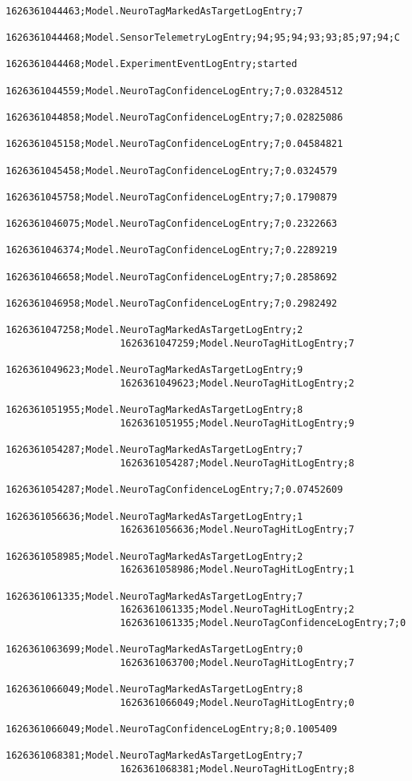                 \begin{lstlisting}
                    1626361044463;Model.NeuroTagMarkedAsTargetLogEntry;7
                    1626361044468;Model.SensorTelemetryLogEntry;94;95;94;93;93;85;97;94;C
                    1626361044468;Model.ExperimentEventLogEntry;started
                    1626361044559;Model.NeuroTagConfidenceLogEntry;7;0.03284512
                    1626361044858;Model.NeuroTagConfidenceLogEntry;7;0.02825086
                    1626361045158;Model.NeuroTagConfidenceLogEntry;7;0.04584821
                    1626361045458;Model.NeuroTagConfidenceLogEntry;7;0.0324579
                    1626361045758;Model.NeuroTagConfidenceLogEntry;7;0.1790879
                    1626361046075;Model.NeuroTagConfidenceLogEntry;7;0.2322663
                    1626361046374;Model.NeuroTagConfidenceLogEntry;7;0.2289219
                    1626361046658;Model.NeuroTagConfidenceLogEntry;7;0.2858692
                    1626361046958;Model.NeuroTagConfidenceLogEntry;7;0.2982492
                    1626361047258;Model.NeuroTagMarkedAsTargetLogEntry;2
                    1626361047259;Model.NeuroTagHitLogEntry;7
                    1626361049623;Model.NeuroTagMarkedAsTargetLogEntry;9
                    1626361049623;Model.NeuroTagHitLogEntry;2
                    1626361051955;Model.NeuroTagMarkedAsTargetLogEntry;8
                    1626361051955;Model.NeuroTagHitLogEntry;9
                    1626361054287;Model.NeuroTagMarkedAsTargetLogEntry;7
                    1626361054287;Model.NeuroTagHitLogEntry;8
                    1626361054287;Model.NeuroTagConfidenceLogEntry;7;0.07452609
                    1626361056636;Model.NeuroTagMarkedAsTargetLogEntry;1
                    1626361056636;Model.NeuroTagHitLogEntry;7
                    1626361058985;Model.NeuroTagMarkedAsTargetLogEntry;2
                    1626361058986;Model.NeuroTagHitLogEntry;1
                    1626361061335;Model.NeuroTagMarkedAsTargetLogEntry;7
                    1626361061335;Model.NeuroTagHitLogEntry;2
                    1626361061335;Model.NeuroTagConfidenceLogEntry;7;0
                    1626361063699;Model.NeuroTagMarkedAsTargetLogEntry;0
                    1626361063700;Model.NeuroTagHitLogEntry;7
                    1626361066049;Model.NeuroTagMarkedAsTargetLogEntry;8
                    1626361066049;Model.NeuroTagHitLogEntry;0
                    1626361066049;Model.NeuroTagConfidenceLogEntry;8;0.1005409
                    1626361068381;Model.NeuroTagMarkedAsTargetLogEntry;7
                    1626361068381;Model.NeuroTagHitLogEntry;8

\end{lstlisting}
